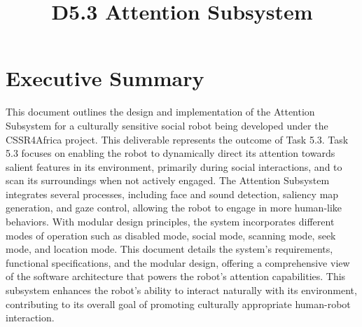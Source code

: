 \documentclass{CSSRforAfrica}
\begin{document}



\title{D5.3 Attention Subsystem}               %

\partner{}                                      




\maketitle

\section*{Executive Summary}
\label{executive_summary}

This document outlines the design and implementation of the Attention Subsystem for a culturally sensitive social robot being developed under the CSSR4Africa project. This deliverable represents the outcome of Task 5.3. Task 5.3 focuses on enabling the robot to dynamically direct its attention towards salient features in its environment, primarily during social interactions, and to scan its surroundings when not actively engaged. The Attention Subsystem integrates several processes, including face and sound detection, saliency map generation, and gaze control, allowing the robot to engage in more human-like behaviors. With modular design principles, the system incorporates different modes of operation such as disabled mode, social mode, scanning mode, seek mode, and location mode. This document details the system's requirements, functional specifications, and the modular design, offering a comprehensive view of the software architecture that powers the robot's attention capabilities. This subsystem enhances the robot’s ability to interact naturally with its environment, contributing to its overall goal of promoting culturally appropriate human-robot interaction.
\end{document}
